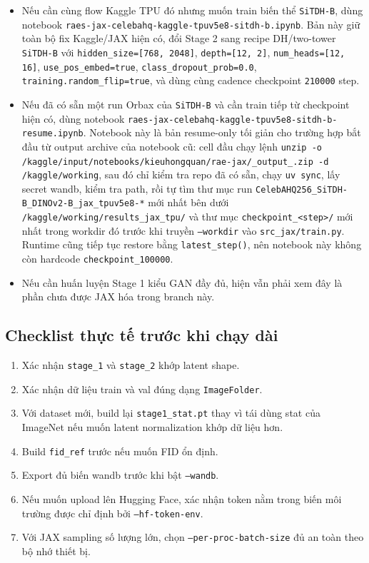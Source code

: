 \begin{itemize}[leftmargin=1.5em]
  từ Hugging Face rồi export sang \texttt{ImageFolder} trước khi build Stage 1 stat, bật \texttt{training.random\_flip=true}, và đã bỏ override chẩn đoán
  \texttt{ema\_decay=0.99} và giữ mốc checkpoint mặc định ở \texttt{210000}
  step, nên mặc định quay lại EMA chuẩn của config.
  \item Nếu cần cùng flow Kaggle TPU đó nhưng muốn train biến thể
  \texttt{SiTDH-B}, dùng notebook
  \texttt{raes-jax-celebahq-kaggle-tpuv5e8-sitdh-b.ipynb}. Bản này giữ toàn bộ
  fix Kaggle/JAX hiện có, đổi Stage 2 sang recipe DH/two-tower
  \texttt{SiTDH-B} với \texttt{hidden\_size=[768, 2048]},
  \texttt{depth=[12, 2]}, \texttt{num\_heads=[12, 16]},
  \texttt{use\_pos\_embed=true}, \texttt{class\_dropout\_prob=0.0},
  \texttt{training.random\_flip=true}, và dùng
  cùng cadence checkpoint \texttt{210000} step.
  \item Nếu đã có sẵn một run Orbax của \texttt{SiTDH-B} và cần train tiếp từ
  checkpoint hiện có, dùng notebook
  \texttt{raes-jax-celebahq-kaggle-tpuv5e8-sitdh-b-resume.ipynb}. Notebook này
  là bản resume-only tối giản cho trường hợp bắt đầu từ output archive của
  notebook cũ: cell đầu chạy lệnh \texttt{unzip -o
  /kaggle/input/notebooks/kieuhongquan/rae-jax/\_output\_.zip -d
  /kaggle/working}, sau đó chỉ kiểm tra repo đã có sẵn, chạy \texttt{uv sync},
  lấy secret wandb, kiểm tra path, rồi tự tìm thư mục run
  \texttt{CelebAHQ256\_SiTDH-B\_DINOv2-B\_jax\_tpuv5e8-*} mới nhất bên dưới
  \texttt{/kaggle/working/results\_jax\_tpu/} và thư mục
  \texttt{checkpoint\_<step>/} mới nhất trong workdir đó trước khi truyền
  \texttt{--workdir} vào \texttt{src\_jax/train.py}. Runtime cũng tiếp
  tục restore bằng \texttt{latest\_step()}, nên notebook này không còn hardcode
  \texttt{checkpoint\_100000}.
  \item Nếu cần huấn luyện Stage 1 kiểu GAN đầy đủ, hiện vẫn phải xem đây là
  phần chưa được JAX hóa trong branch này.
\end{itemize}

\subsection{Checklist thực tế trước khi chạy dài}

\begin{enumerate}[leftmargin=1.8em]
  \item Xác nhận \texttt{stage\_1} và \texttt{stage\_2} khớp latent shape.
  \item Xác nhận dữ liệu train và val đúng dạng \texttt{ImageFolder}.
  \item Với dataset mới, build lại \texttt{stage1\_stat.pt} thay vì tái dùng stat
  của ImageNet nếu muốn latent normalization khớp dữ liệu hơn.
  \item Build \texttt{fid\_ref} trước nếu muốn FID ổn định.
  \item Export đủ biến wandb trước khi bật \texttt{--wandb}.
  \item Nếu muốn upload lên Hugging Face, xác nhận token nằm trong biến môi
  trường được chỉ định bởi \texttt{--hf-token-env}.
  \item Với JAX sampling số lượng lớn, chọn \texttt{--per-proc-batch-size} đủ an
  toàn theo bộ nhớ thiết bị.
\end{enumerate}
